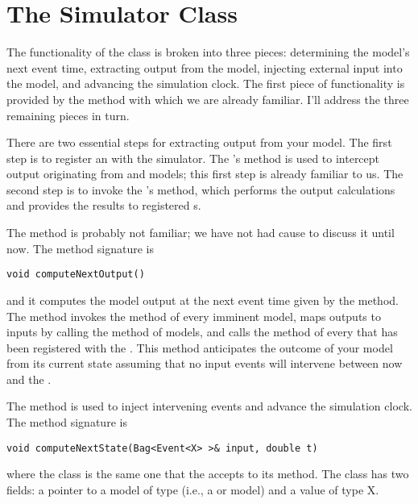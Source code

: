 \chapter{The Simulator Class}
The functionality of the  class is broken into three pieces: determining the model's next event time, extracting output from the model, injecting external input into the model, and advancing the simulation clock. The first piece of functionality is provided by the  method with which we are already familiar. I'll address the three remaining pieces in turn. 

There are two essential steps for extracting output from your model. The first step is to register an  with the simulator. The 's  method is used to intercept output originating from  and  models; this first step is already familiar to us. The second step is to invoke the 's  method, which performs the output calculations and provides the results to registered s.

The  method is probably not familiar; we have not had cause to discuss it until now. The method signature is
\begin{verbatim}
void computeNextOutput()
\end{verbatim}
and it computes the model output at the next event time given by the  method. The  method invokes the  method of every imminent  model, maps outputs to inputs by calling the  method of  models, and calls the  method of every  that has been registered with the . This method anticipates the outcome of your model from its current state assuming that no input events will intervene between now and the .

The  method is used to inject intervening events and advance the simulation clock. The method signature is
\begin{verbatim}
void computeNextState(Bag<Event<X> >& input, double t)
\end{verbatim}
where the  class is the same one that the  accepts to its  method. The  class has two fields: a pointer to a model of type  (i.e., a  or  model) and a value of type X. 

